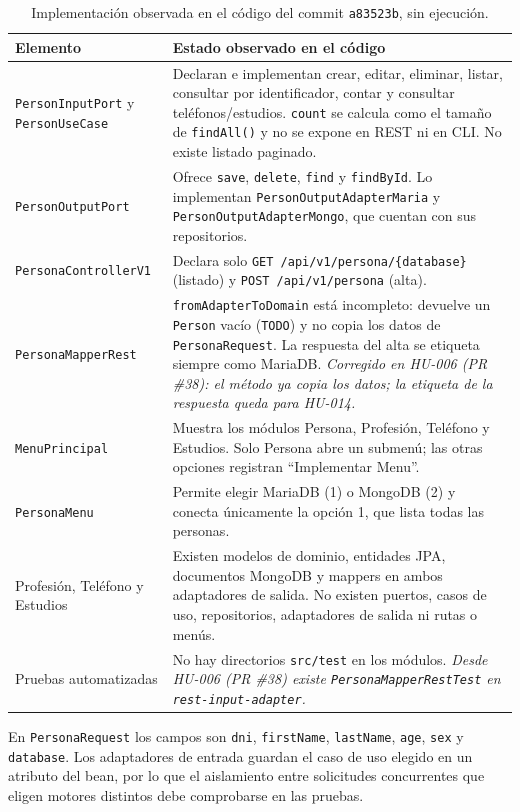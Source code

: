 \documentclass[11pt,a4paper]{article}
\begin{document}
\begin{table}[H]
\centering\small
\begin{tabularx}{\textwidth}{@{}p{3.6cm}X@{}}
\toprule
\textbf{Elemento}&\textbf{Estado observado en el código}\\\midrule
\texttt{PersonInputPort} y \texttt{PersonUseCase}&Declaran e implementan crear, editar, eliminar, listar, consultar por identificador, contar y consultar teléfonos/estudios. \texttt{count} se calcula como el tamaño de \texttt{findAll()} y no se expone en REST ni en CLI. No existe listado paginado.\\
\texttt{PersonOutputPort}&Ofrece \texttt{save}, \texttt{delete}, \texttt{find} y \texttt{findById}. Lo implementan \texttt{PersonOutputAdapterMaria} y \texttt{PersonOutputAdapterMongo}, que cuentan con sus repositorios.\\
\texttt{PersonaControllerV1}&Declara solo \texttt{GET /api/v1/persona/\{database\}} (listado) y \texttt{POST /api/v1/persona} (alta).\\
\texttt{PersonaMapperRest}&\texttt{fromAdapterToDomain} está incompleto: devuelve un \texttt{Person} vacío (\texttt{TODO}) y no copia los datos de \texttt{PersonaRequest}. La respuesta del alta se etiqueta siempre como MariaDB. \emph{Corregido en HU-006 (PR \#38): el método ya copia los datos; la etiqueta de la respuesta queda para HU-014.}\\
\texttt{MenuPrincipal}&Muestra los módulos Persona, Profesión, Teléfono y Estudios. Solo Persona abre un submenú; las otras opciones registran ``Implementar Menu''.\\
\texttt{PersonaMenu}&Permite elegir MariaDB (1) o MongoDB (2) y conecta únicamente la opción 1, que lista todas las personas.\\
Profesión, Teléfono y Estudios&Existen modelos de dominio, entidades JPA, documentos MongoDB y mappers en ambos adaptadores de salida. No existen puertos, casos de uso, repositorios, adaptadores de salida ni rutas o menús.\\
Pruebas automatizadas&No hay directorios \texttt{src/test} en los módulos. \emph{Desde HU-006 (PR \#38) existe \texttt{PersonaMapperRestTest} en \texttt{rest-input-adapter}.}\\
\bottomrule
\end{tabularx}
\caption{Implementación observada en el código del commit \texttt{a83523b}, sin ejecución.}
\end{table}

En \texttt{PersonaRequest} los campos son \texttt{dni}, \texttt{firstName},
\texttt{lastName}, \texttt{age}, \texttt{sex} y \texttt{database}. Los
adaptadores de entrada guardan el caso de uso elegido en un atributo del bean,
por lo que el aislamiento entre solicitudes concurrentes que eligen motores
distintos debe comprobarse en las pruebas.
\end{document}
